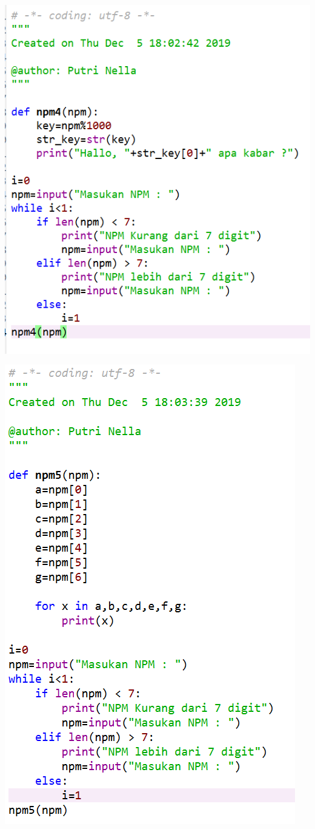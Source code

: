 \documentclass[a4paper, 12pt]{article}
\begin{document}
\begin{center}
\includegraphics[width=.8\textwidth]{figure/4.PNG}
\end{center}
\item
\begin{center}
\includegraphics[width=.8\textwidth]{figure/5.PNG}
\end{center}
\end{document}
